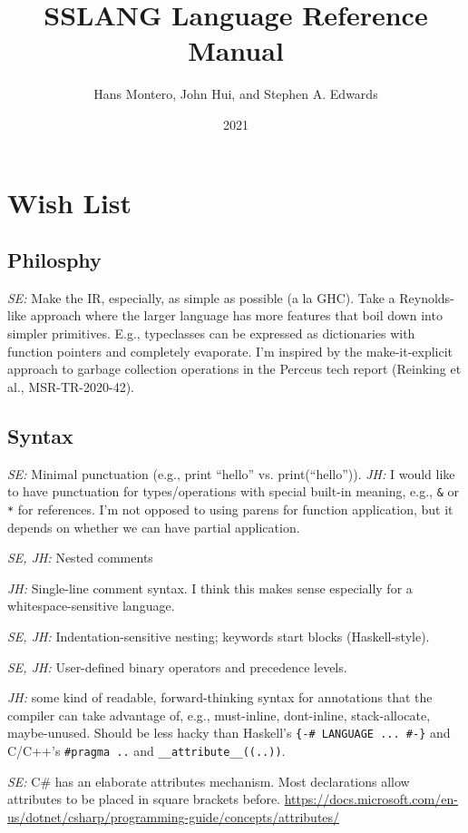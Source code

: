 \documentclass{article}
\title{SSLANG Language Reference Manual}
\author{Hans Montero, John Hui, and Stephen A. Edwards}
\date{2021}
\begin{document}
\maketitle

\section{Wish List}

\subsection{Philosphy}

\textit{SE:} Make the IR, especially, as simple as possible (a la
GHC). Take a Reynolds-like approach where the larger language has more
features that boil down into simpler primitives.  E.g., typeclasses
can be expressed as dictionaries with function pointers and completely
evaporate.  I'm inspired by the make-it-explicit approach to garbage
collection operations in the Perceus tech report (Reinking et al.,
MSR-TR-2020-42).

\subsection{Syntax}

\textit{SE:} Minimal punctuation (e.g., print ``hello'' vs. print(``hello'')).
\textit{JH:} I would like to have punctuation for types/operations with special
built-in meaning, e.g., \verb|&| or \verb|*| for references. I'm not opposed to
using parens for function application, but it depends on whether we can have
partial application.

\textit{SE, JH:} Nested comments

\textit{JH:} Single-line comment syntax. I think this makes sense especially for
a whitespace-sensitive language.

\textit{SE, JH:} Indentation-sensitive nesting; keywords start blocks (Haskell-style).

\textit{SE, JH:} User-defined binary operators and precedence levels.

\textit{JH:} some kind of readable, forward-thinking syntax for annotations that
the compiler can take advantage of, e.g., must-inline, dont-inline,
stack-allocate, maybe-unused. Should be less hacky than Haskell's
\verb|{-# LANGUAGE ... #-}| and C/C++'s \verb|#pragma ..| and
\verb|__attribute__((..))|.

\textit{SE:} C\# has an elaborate attributes mechanism.
Most declarations allow attributes to be placed in square brackets before.  \url{https://docs.microsoft.com/en-us/dotnet/csharp/programming-guide/concepts/attributes/}
\end{document}
